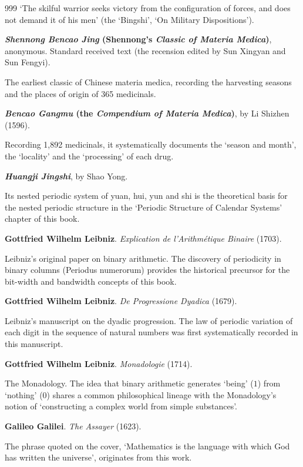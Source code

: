\begin{thebibliography}{999}
`The skilful warrior seeks victory from the configuration of forces, and does not demand it of his men' (the `Bingshi', `On Military Dispositions').

 \textbf{\textit{Shennong Bencao Jing} (Shennong's \textit{Classic of Materia Medica})}, anonymous. Standard received text (the recension edited by Sun Xingyan and Sun Fengyi).

The earliest classic of Chinese materia medica, recording the harvesting seasons and the places of origin of 365 medicinals.

 \textbf{\textit{Bencao Gangmu} (the \textit{Compendium of Materia Medica})}, by Li Shizhen (1596).

Recording 1,892 medicinals, it systematically documents the `season and month', the `locality' and the `processing' of each drug.

 \textbf{\textit{Huangji Jingshi}}, by Shao Yong.

Its nested periodic system of yuan, hui, yun and shi is the theoretical basis for the nested periodic structure in the `Periodic Structure of Calendar Systems' chapter of this book.

 \textbf{Gottfried Wilhelm Leibniz}. \textit{Explication de l'Arithm\'etique Binaire} (1703).

Leibniz's original paper on binary arithmetic. The discovery of periodicity in binary columns (Periodus numerorum) provides the historical precursor for the bit-width and bandwidth concepts of this book.

 \textbf{Gottfried Wilhelm Leibniz}. \textit{De Progressione Dyadica} (1679).

Leibniz's manuscript on the dyadic progression. The law of periodic variation of each digit in the sequence of natural numbers was first systematically recorded in this manuscript.

 \textbf{Gottfried Wilhelm Leibniz}. \textit{Monadologie} (1714).

The Monadology. The idea that binary arithmetic generates `being' ($1$) from `nothing' ($0$) shares a common philosophical lineage with the Monadology's notion of `constructing a complex world from simple substances'.

 \textbf{Galileo Galilei}. \textit{The Assayer} (1623).

The phrase quoted on the cover, `Mathematics is the language with which God has written the universe', originates from this work.


\end{thebibliography}
